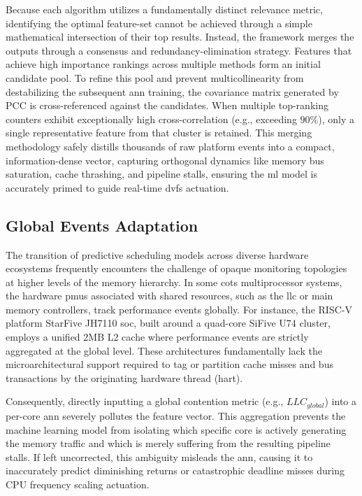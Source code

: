 \documentclass[conference]{IEEEtran}
\begin{document}
Because each algorithm utilizes a fundamentally distinct relevance metric, identifying the optimal feature-set cannot be achieved through a simple mathematical intersection of their top results. Instead, the framework merges the outputs through a consensus and redundancy-elimination strategy. Features that achieve high importance rankings across multiple methods form an initial candidate pool. To refine this pool and prevent multicollinearity from destabilizing the subsequent \gls{ann} training, the covariance matrix generated by PCC is cross-referenced against the candidates. When multiple top-ranking counters exhibit exceptionally high cross-correlation (e.g., exceeding $90\%$), only a single representative feature from that cluster is retained. This merging methodology safely distills thousands of raw platform events into a compact, information-dense vector, capturing orthogonal dynamics like memory bus saturation, cache thrashing, and pipeline stalls, ensuring the \gls{ml} model is accurately primed to guide real-time \gls{dvfs} actuation.

\subsection{Global Events Adaptation}\label{sec:global_events}

The transition of predictive scheduling models across diverse hardware ecosystems frequently encounters the challenge of opaque monitoring topologies at higher levels of the memory hierarchy. In some \gls{cots} multiprocessor systems, the hardware \glspl{pmu} associated with shared resources, such as the \gls{llc} or main memory controllers, track performance events globally. For instance, the RISC-V platform StarFive JH7110 \gls{soc}, built around a quad-core SiFive U74 cluster, employs a unified 2MB L2 cache where performance events are strictly aggregated at the global level. These architectures fundamentally lack the microarchitectural support required to tag or partition cache misses and bus transactions by the originating hardware thread (hart). 

Consequently, directly inputting a global contention metric (e.g., $LLC_{global}$) into a per-core \gls{ann} severely pollutes the feature vector. This aggregation prevents the machine learning model from isolating which specific core is actively generating the memory traffic and which is merely suffering from the resulting pipeline stalls. If left uncorrected, this ambiguity misleads the \gls{ann}, causing it to inaccurately predict diminishing returns or catastrophic deadline misses during CPU frequency scaling actuation.
\end{document}
